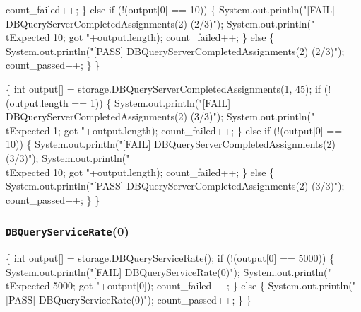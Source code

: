 \documentclass{article}
\def\nwendcode{\endtrivlist \endgroup}
\let\nwdocspar=\par
\begin{document}
    count_failed++;
  \} else if (!(output[0] == 10)) \{
    System.out.println("[FAIL] DBQueryServerCompletedAssignments(2) (2/3)");
    System.out.println("\\tExpected 10; got "+output.length);
    count_failed++;
  \} else \{
    System.out.println("[PASS] DBQueryServerCompletedAssignments(2) (2/3)");
    count_passed++;
  \}
\}
\nwendcode{}\nwdocspar
\nwenddocs{}\endmoddef{}
\{
  int output[] = storage.DBQueryServerCompletedAssignments(1, 45);
  if (!(output.length == 1)) \{
    System.out.println("[FAIL] DBQueryServerCompletedAssignments(2) (3/3)");
    System.out.println("\\tExpected 1; got "+output.length);
    count_failed++;
  \} else if (!(output[0] == 10)) \{
    System.out.println("[FAIL] DBQueryServerCompletedAssignments(2) (3/3)");
    System.out.println("\\tExpected 10; got "+output.length);
    count_failed++;
  \} else \{
    System.out.println("[PASS] DBQueryServerCompletedAssignments(2) (3/3)");
    count_passed++;
  \}
\}
\nwendcode{}\nwdocspar
\subsubsection{{\tt{}DBQueryServiceRate}(0)}
\nwenddocs{}\endmoddef{}
\{
  int output[] = storage.DBQueryServiceRate();
  if (!(output[0] == 5000)) \{
    System.out.println("[FAIL] DBQueryServiceRate(0)");
    System.out.println("\\tExpected 5000; got "+output[0]);
    count_failed++;
  \} else \{
    System.out.println("[PASS] DBQueryServiceRate(0)");
    count_passed++;
  \}
\}
\nwendcode{}\nwdocspar
\end{document}
